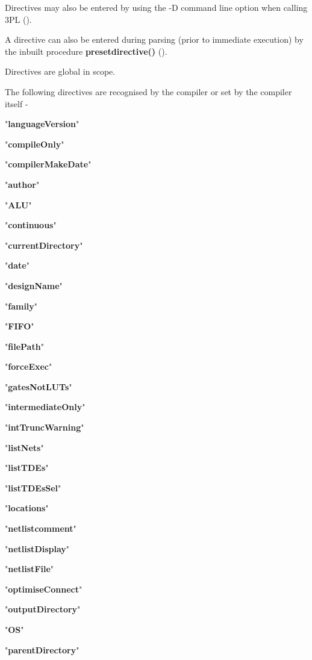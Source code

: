         Directives may also be entered by using the -D command line option when
        calling 3PL ().

        A directive can also be entered during parsing (prior to immediate
        execution) by the inbuilt procedure {\bf presetdirective()}
        ().

        Directives are global in scope.
        
        The following directives are recognised by the compiler or set by the
        compiler itself -
        
        \blist
        \item   "{\bf languageVersion}"
	\item   "{\bf compileOnly}"
        \item   "{\bf compilerMakeDate}"
        \item   "{\bf author}"
        \item   "{\bf ALU}"
        \item   "{\bf continuous}"
        \item   "{\bf currentDirectory}"
        \item   "{\bf date}"
        \item   "{\bf designName}"
        \item   "{\bf family}"
        \item   "{\bf FIFO}"
        \item   "{\bf filePath}"
	\item   "{\bf forceExec}"
        \item   "{\bf gatesNotLUTs}"
	\item   "{\bf intermediateOnly}"
        \item   "{\bf intTruncWarning}"
	\item   "{\bf listNets}"
	\item   "{\bf listTDEs}"
	\item   "{\bf listTDEsSel}"
	\item   "{\bf locations}"
        \item   "{\bf netlistcomment}"
        \item   "{\bf netlistDisplay}"
        \item   "{\bf netlistFile}"
        \item   "{\bf optimiseConnect}"
        \item   "{\bf outputDirectory}"
        \item   "{\bf OS}"
        \item   "{\bf parentDirectory}"
